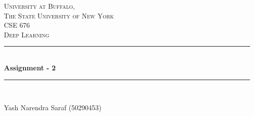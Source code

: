 \begin{titlepage}

\newcommand{\HRule}{\rule{\linewidth}{0.5mm}} %

\center %
 
\vspace*{150px}
\textsc{\LARGE University at Buffalo, \\The State University of New York}\\[1.5cm] %
\textsc{\large CSE 676}\\[0.5cm] %
\textsc{\large Deep Learning}\\[0.5cm] %


\HRule \\[0.4cm]
{ \LARGE \bfseries Assignment - 2}\\[0.4cm] %
\HRule \\[1.5cm]
 

\begin{center}
\Large Yash Narendra Saraf (50290453)\\
\end{center}





\end{titlepage}

